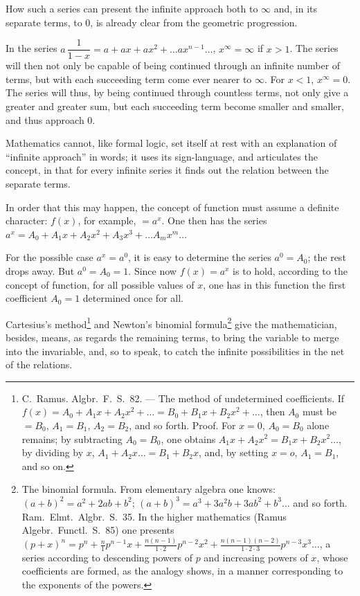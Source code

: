 \documentclass[12pt]{book}
\begin{document}
How such a series can present the infinite approach both to $\infty$ and, in its
separate terms, to $0$, is already clear from the geometric progression.

In the series $a\,\dfrac{1}{1-x} = a + ax + ax^{2} + \dots ax^{n-1}\dots$,
$x^{\infty} = \infty$ if $x > 1$. The series will then not only be capable of being
continued through an infinite number of terms, but with each succeeding term come
ever nearer to $\infty$. For $x < 1$, $x^{\infty} = 0$. The series will thus, by
being continued through countless terms, not only give a greater and greater sum,
but each succeeding term become smaller and smaller, and thus approach $0$.

Mathematics cannot, like formal logic, set itself at rest with an explanation of
``infinite approach'' in
words; it uses its sign-language, and articulates the concept, in that for every
infinite series it finds out the relation between the separate terms.

In order that this may happen, the concept of function must assume a definite
character: $f(x)$, for example, $= a^{x}$. One then has the series
$a^{x} = A_0 + A_1 x + A_2 x^{2} + A_3 x^{3} + \dots A_m x^{m} \dots$

For the possible case $a^{x} = a^{0}$, it is easy to determine the series
$a^{0} = A_0$; the rest drops away. But $a^{0} = A_0 = 1$. Since now $f(x) = a^{x}$
is to hold, according to the concept of function, for all possible values of $x$,
one has in this function the first coefficient $A_0 = 1$ determined once for all.

Cartesius's method\footnote{C.\ Ramus. Algbr.\ F.\ S.\ 82. --- The method of
undetermined coefficients. If $f(x) = A_0 + A_1 x + A_2 x^{2} + \dots
= B_0 + B_1 x + B_2 x^{2} + \dots$, then $A_0$ must be $= B_0$, $A_1 = B_1$,
$A_2 = B_2$, and so forth. Proof. For $x = 0$, $A_0 = B_0$ alone remains; by
subtracting $A_0 = B_0$, one obtains $A_1 x + A_2 x^{2} = B_1 x + B_2 x^{2}\dots$,
by dividing by $x$, $A_1 + A_2 x\dots = B_1 + B_2 x$, and, by setting $x = o$,
$A_1 = B_1$, and so on.} and Newton's binomial formula\footnote{The binomial
formula. From elementary algebra one knows: $(a+b)^{2} = a^{2} + 2ab + b^{2}$;
$(a+b)^{3} = a^{3} + 3a^{2}b + 3ab^{2} + b^{3}\dots$ and so forth. Ram.\ Elmt.\
Algbr.\ S.\ 35. In the higher mathematics (Ramus Algebr.\ Functl.\ S.\ 85) one
presents $(p+x)^{n} = p^{n} + \frac{n}{1}p^{n-1}x + \frac{n(n-1)}{1\cdot 2}
p^{n-2}x^{2} + \frac{n(n-1)(n-2)}{1\cdot 2\cdot 3}p^{n-3}x^{3}\dots$, a series
according to descending powers of $p$ and increasing powers of $x$, whose
coefficients are formed, as the analogy shows, in a manner corresponding to the
exponents of the powers.} give the mathematician, besides, means, as regards the
remaining terms, to bring the variable to merge into the invariable, and, so to
speak, to catch the infinite possibilities in the net of the relations.
\end{document}
